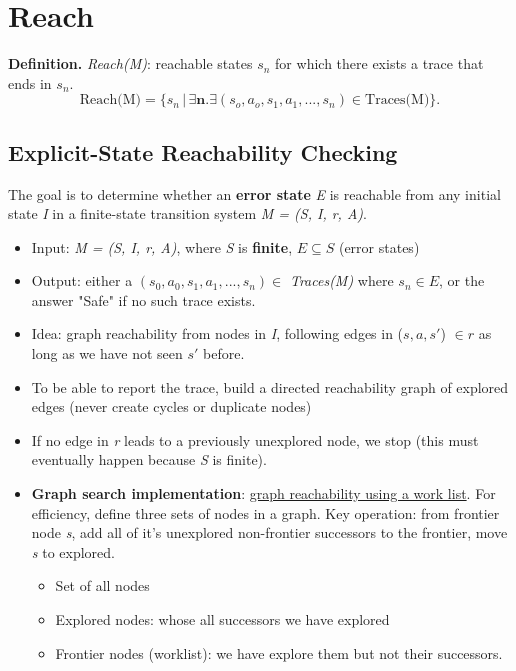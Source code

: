 \documentclass[11pt]{article}
\begin{document}
\section*{Reach}

\begin{tcolorbox}[
    enhanced,
    frame hidden,
    borderline west={2pt}{0pt}{black},
    boxsep=5pt,
    left=8pt
]
\textbf{Definition.} \textit{Reach(M)}: reachable states $s_n$ for which there exists a trace that ends in $s_n$. 
\[
	\text{Reach(M)} = \{s_n \, | \, \exists \textbf{n}. \exists (s_o, a_o, s_1, a_1, ..., s_n) \in \text{Traces(M)} \} 
.\] 
\end{tcolorbox}

\subsection*{Explicit-State Reachability Checking}
The goal is to determine whether an \textbf{error state} \textit{E} is reachable from any initial state \textit{I} in a finite-state transition system \textit{M = (S, I, r, A)}.

\begin{itemize}
	\item Input: \textit{M = (S, I, r, A)}, where \textit{S} is \textbf{finite}, $E \subseteq S$ (error states)
	\item Output: either a $(s_0, a_0, s_1, a_1, ..., s_n) \in$ \textit{Traces(M)} where $s_n \in E$, or the answer "Safe" if no such trace exists.
	\item Idea: graph reachability from nodes in \textit{I}, following edges in ($s, a, s'$) $\in r$ as long as we have not seen $s'$ before. 
	\item To be able to report the trace, build a directed reachability graph of explored edges (never create cycles or duplicate nodes)
	\item If no edge in \textit{r} leads to a previously unexplored node, we stop (this must eventually happen because \textit{S} is finite). 
	\item \textbf{Graph search implementation}: \underline{graph reachability using a work list}. For efficiency, define three sets of nodes in a graph. Key operation: from frontier node \textit{s}, add all of it's unexplored non-frontier successors to the frontier, move \textit{s} to explored. 
	\begin{itemize}
		\item Set of all nodes
		\item Explored nodes: whose all successors we have explored
		\item Frontier nodes (worklist): we have explore them but not their successors. 
	\end{itemize}
	
\end{itemize}
\end{document}
